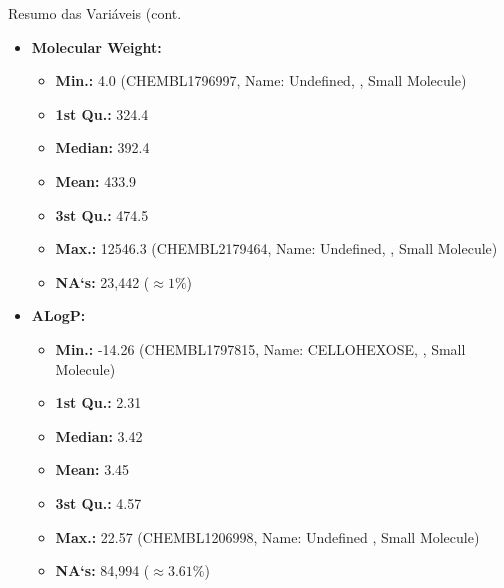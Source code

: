 \documentclass[8pt]{beamer}
\begin{document}
\begin{frame}{Resumo das Variáveis (cont.}
\begin{multicols}{2}
  \begin{itemize}
     \item \textbf{Molecular Weight:}
    \begin{itemize}
        \item \textbf{Min.:} 4.0 (CHEMBL1796997, Name: Undefined,  , Small Molecule)
        \item \textbf{1st Qu.:} 324.4
        \item \textbf{Median:} 392.4
        \item \textbf{Mean:} 433.9
        \item \textbf{3st Qu.:} 474.5
        \item \textbf{Max.:} 12546.3 (CHEMBL2179464, Name: Undefined, , Small Molecule)
        \item \textbf{NA`s:} 23,442 ($\approx 1\% $)
    \end{itemize}
     \item \textbf{ALogP:}
    \begin{itemize}
        \item \textbf{Min.:} -14.26 (CHEMBL1797815, Name: CELLOHEXOSE,  , Small Molecule)
        \item \textbf{1st Qu.:} 2.31
        \item \textbf{Median:} 3.42
        \item \textbf{Mean:} 3.45
        \item \textbf{3st Qu.:} 4.57
        \item \textbf{Max.:} 22.57 (CHEMBL1206998, Name: Undefined  , Small Molecule)
        \item \textbf{NA`s:} 84,994 ($\approx 3.61\% $)
    
    \end{itemize}
  \end{itemize}
  \end{multicols}
\end{frame}
\end{document}

